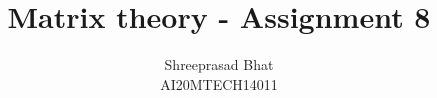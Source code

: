 \documentclass[journal,12pt,twocolumn]{IEEEtran}
\begin{document}
\makeatletter
{}
\makeatother
\let\StandardTheFigure\thefigure
\let\vec\mathbf
\renewcommand{\thefigure}{\theproblem}
\def\putbox#1#2#3{\makebox[0in][l]{\makebox[#1][l]{}\raisebox{\baselineskip}[0in][0in]{\raisebox{#2}[0in][0in]{#3}}}}
     \def\rightbox#1{\makebox[0in][r]{#1}}
     \def\centbox#1{\makebox[0in]{#1}}
     \def\topbox#1{\raisebox{-\baselineskip}[0in][0in]{#1}}
     \def\midbox#1{\raisebox{-0.5\baselineskip}[0in][0in]{#1}}
\vspace{3cm}
\title{Matrix theory - Assignment 8}
\author{Shreeprasad Bhat\\AI20MTECH14011}
%
%
%
% 
%
\end{document}
